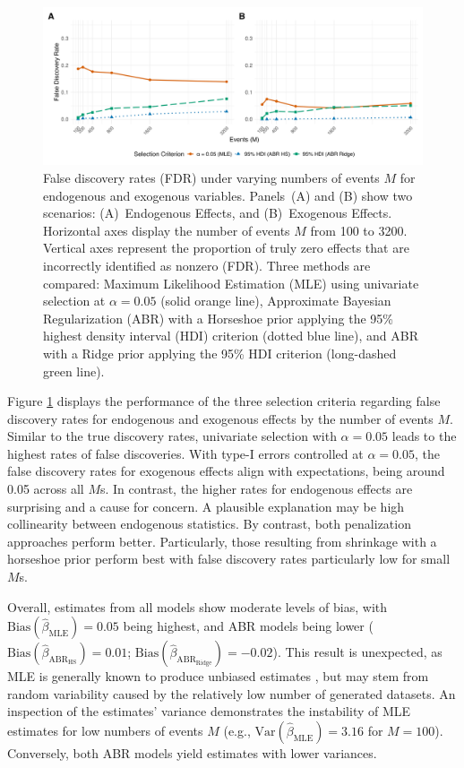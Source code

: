 \documentclass{article}
\begin{document}
\begin{spacing}{2}
\begin{justify}
\begin{figure}[H]
    \centering
    \includegraphics[width=\textwidth]{img/false_discovery_rates.png}
    \caption{False discovery rates (FDR) under varying numbers of events $M$ for endogenous and exogenous variables. Panels~(A) and (B) show two scenarios: (A)~Endogenous Effects, and (B)~Exogenous Effects. Horizontal axes display the number of events $M$ from 100 to 3200. Vertical axes represent the proportion of truly zero effects that are incorrectly identified as nonzero (FDR). Three methods are compared: Maximum Likelihood Estimation (MLE) using univariate selection at $\alpha=0.05$ (solid orange line), Approximate Bayesian Regularization (ABR) with a Horseshoe prior applying the 95\% highest density interval (HDI) criterion (dotted blue line), and ABR with a Ridge prior applying the 95\% HDI criterion (long-dashed green line).}
    \label{fig:false_discovery_rates}
\end{figure}

Figure \ref{fig:false_discovery_rates} displays the performance of the three selection criteria regarding false discovery rates for endogenous and exogenous effects by the number of events $M$. Similar to the true discovery rates, univariate selection with $\alpha=0.05$ leads to the highest rates of false discoveries. With type-I errors controlled at $\alpha=0.05$, the false discovery rates for exogenous effects align with expectations, being around 0.05 across all $M$s. In contrast, the higher rates for endogenous effects are surprising and a cause for concern. A plausible explanation may be high collinearity between endogenous statistics. By contrast, both penalization approaches perform better. Particularly, those resulting from shrinkage with a horseshoe prior perform best with false discovery rates particularly low for small $M$s.

Overall, estimates from all models show moderate levels of bias, with $\text{Bias}(\hat{\beta}_{\text{MLE}})=0.05$ being highest, and ABR models being lower ($\text{Bias}(\hat{\beta}_{\text{ABR}_{\text{HS}}})=0.01$; $\text{Bias}(\hat{\beta}_{\text{ABR}_{\text{Ridge}}})=-0.02$). This result is unexpected, as MLE is generally known to produce unbiased estimates \citep{Butts2008, Brandenberger2019}, but may stem from random variability caused by the relatively low number of generated datasets. An inspection of the estimates' variance demonstrates the instability of MLE estimates for low numbers of events $M$ (e.g., $\text{Var}(\hat{\beta}_{\text{MLE}}) = 3.16$ for $M=100$). Conversely, both ABR models yield estimates with lower variances.


\end{justify}
\end{spacing}
\end{document}
